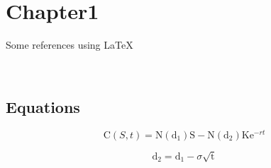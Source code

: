 \section{Chapter1}
	\label{sec:chapter1}

	Some references using \LaTeX

	\citep[p.~34]{de1998little} \\
	\citep{de1998little,bieger2013}


\subsection{Equations}
	\label{subsec:equ}


	\begin{equation}
	\mathrm C( S, t)= \mathrm N(\mathrm d_1)\mathrm S - \mathrm N(\mathrm d_2) \mathrm K \mathrm e^{-rt}
	\label{eq:1}
	\end{equation}

	\begin{equation}
	\mathrm d_2= \mathrm d_1 - \sigma \sqrt{\mathrm t}
	\label{eq:3}
	\end{equation}

	\newpage
